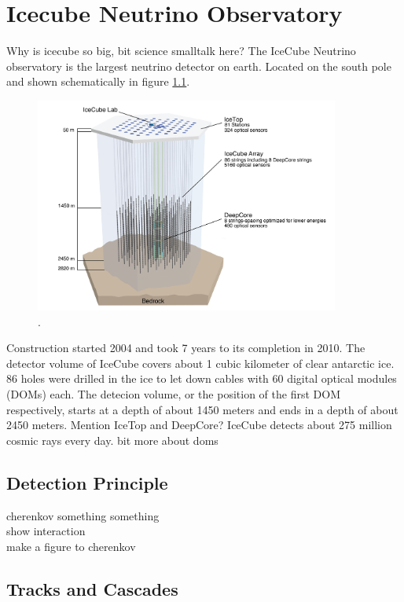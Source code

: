 \chapter{Icecube Neutrino Observatory}

Why is icecube so big, bit science smalltalk here?
The IceCube Neutrino observatory is the largest neutrino detector on earth.
Located on the south pole and shown schematically in figure \ref{fig:icecube}.

\begin{figure}
    \centering
    \includegraphics[width=10cm]{Plots/01_7_icecube/IceCube-Array.jpg}
    \caption{\cite{icecube_website}.}
    \label{fig:icecube}
\end{figure}

Construction started 2004 and took 7 years to its completion in 2010.
The detector volume of IceCube covers about 1 cubic kilometer of clear antarctic ice.
86 holes were drilled in the ice to let down cables with 60 digital optical modules (DOMs) each.
The detecion volume, or the position of the first DOM respectively, starts at a depth of about 1450 meters and ends in a depth of about 2450 meters.
Mention IceTop and DeepCore?
IceCube detects about 275 million cosmic rays every day.
bit more about doms


\section{Detection Principle}
cherenkov something something\\
show interaction\\
make a figure to cherenkov\\

\section{Tracks and Cascades}


